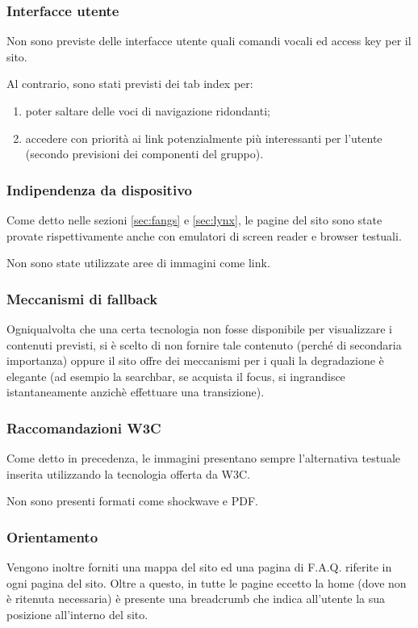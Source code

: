 \subsubsection{Interfacce utente}
Non sono previste delle interfacce utente quali comandi vocali ed access key
per il sito.

Al contrario, sono stati previsti dei tab index per:
\begin{enumerate}
\item poter saltare delle voci di navigazione ridondanti;
\item accedere con priorità ai link potenzialmente più interessanti per
l'utente (secondo previsioni dei componenti del gruppo).
\end{enumerate}

\subsubsection{Indipendenza da dispositivo}
Come detto nelle sezioni \ref{sec:fangs} e \ref{sec:lynx}, le pagine del sito
sono state provate rispettivamente anche con emulatori di screen reader e
browser testuali.

Non sono state utilizzate aree di immagini come link.

\subsubsection{Meccanismi di fallback}
Ogniqualvolta che una certa tecnologia non fosse disponibile per visualizzare i
contenuti previsti, si è scelto di non fornire tale contenuto (perché
di secondaria importanza) oppure il sito offre dei meccanismi per i quali la
degradazione è elegante (ad esempio la searchbar, se acquista il focus, si
ingrandisce istantaneamente anzichè effettuare una transizione).

\subsubsection{Raccomandazioni W3C}
Come detto in precedenza, le immagini presentano sempre l'alternativa testuale
inserita utilizzando la tecnologia offerta da W3C.

Non sono presenti formati come shockwave e PDF.

\subsubsection{Orientamento}
Vengono inoltre forniti una mappa del sito ed una pagina di F.A.Q. riferite in
ogni pagina del sito. Oltre a questo, in tutte le pagine eccetto la home (dove
non è ritenuta necessaria) è presente una breadcrumb che indica all'utente la
sua posizione all'interno del sito.


